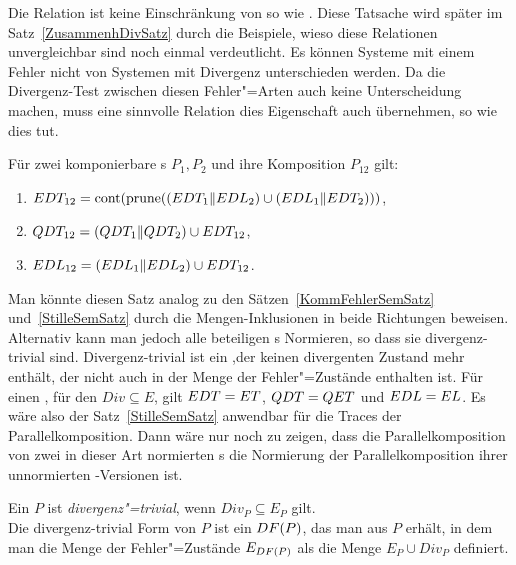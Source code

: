 Die Relation \DRel{} ist keine Einschränkung von \ERel{} so wie \QRel{}. Diese
Tatsache wird später im Satz~\ref{ZusammenhDivSatz} durch die Beispiele, wieso
diese Relationen unvergleichbar sind noch einmal verdeutlicht. Es können
Systeme mit einem Fehler nicht von Systemen mit Divergenz unterschieden werden.
Da die Divergenz-Test zwischen diesen \glqq Fehler"=Arten\grqq{} auch keine
Unterscheidung machen, muss eine sinnvolle Relation dies Eigenschaft auch
übernehmen, so wie \DRel{} dies tut.

\begin{Satz}
  \label{DivSemSatz}
  Für zwei komponierbare \MEIO{}s $P_1,P_2$ und ihre Komposition $P_{12}$ gilt:
  \begin{enumerate}
    \item $EDT _{12} =\mathrm{cont} (\mathrm{prune} ((EDT _1\|EDL _2)\cup (EDL _1\|EDT
      _2)))$,
    \item $QDT _{12} =(QDT _1\|QDT _2)\cup EDT _{12}$,
    \item $EDL _{12} =(EDL _1\|EDL _2)\cup EDT _{12}$.
  \end{enumerate}
\end{Satz}

Man könnte diesen Satz analog zu den Sätzen~\ref{KommFehlerSemSatz}
und~\ref{StilleSemSatz} durch die Mengen-Inklusionen in beide Richtungen
beweisen. Alternativ kann man jedoch alle beteiligen \MEIO{}s Normieren, so
dass sie divergenz-trivial sind. Divergenz-trivial ist ein \MEIO{},der keinen
divergenten Zustand mehr enthält, der nicht auch in der Menge der
Fehler"=Zustände enthalten ist. Für einen \MEIO{}, für den $Div\subseteq E$,
gilt $EDT = ET$, $QDT = QET$ und $EDL = EL$. Es wäre also der
Satz~\ref{StilleSemSatz} anwendbar für die Traces der Parallelkomposition. Dann
wäre nur noch zu zeigen, dass die Parallelkomposition von zwei in dieser Art
normierten \MEIO{}s die Normierung der Parallelkomposition ihrer unnormierten
\MEIO{}-Versionen ist.

\begin{Def}
  \label{DivNormDef}
  Ein \MEIO{} $P$ ist \emph{divergenz"=trivial}, wenn $Div _P \subseteq E_P$
  gilt.\\
  Die divergenz-trivial Form von $P$ ist ein \MEIO{} $DF (P)$, das man aus $P$
  erhält, in dem man die Menge der Fehler"=Zustände $E_{DF (P)}$ als die Menge
  $E_P \cup Div _P$ definiert.
\end{Def}

